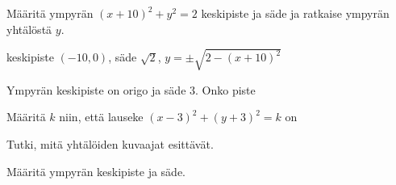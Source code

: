 \begin{tehtavasivu}
\begin{tehtava}
Määritä ympyrän $(x+10)^2+y^2=2$ keskipiste ja säde ja ratkaise ympyrän yhtälöstä $y$. 
\begin{vastaus}
keskipiste $(-10,0)$, säde $\sqrt{2}$, $y=\pm\sqrt{2-(x+10)^2}$ 
\end{vastaus}
\end{tehtava}

\begin{tehtava}
Ympyrän keskipiste on origo ja säde $3$. Onko piste 
\begin{alakohdat}
\end{alakohdat}
\begin{vastaus}
\begin{alakohdat}
\end{alakohdat}
\end{vastaus}
\end{tehtava}

\begin{tehtava}
Määritä $k$ niin, että lauseke $(x-3)^2+(y+3)^2=k$ on
\begin{alakohdat}
\end{alakohdat}
\begin{vastaus}
\begin{alakohdat}
\end{alakohdat}
\end{vastaus}
\end{tehtava}

\begin{tehtava}
Tutki, mitä yhtälöiden kuvaajat esittävät.
\begin{alakohdat}
\end{alakohdat}
\begin{vastaus}
\begin{alakohdat}
\end{alakohdat}
\end{vastaus}
\end{tehtava}

\begin{tehtava}
Määritä ympyrän keskipiste ja säde.
\begin{alakohdat}
\end{alakohdat}
\begin{vastaus}
\begin{alakohdat}
\end{alakohdat}
\end{vastaus}
\end{tehtava}


\end{tehtavasivu}
